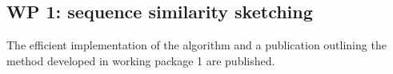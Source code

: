 

\subsection{WP 1: sequence similarity sketching}
The efficient implementation of the algorithm and a publication outlining the method developed in working package 1 are published. 
